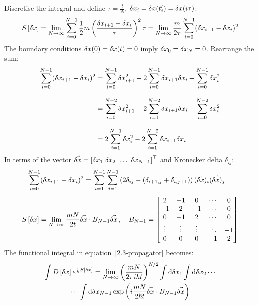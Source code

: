 Discretise the integral and define $\tau = \frac{t}{N}$,
$\delta{x}_i = \delta{x}(t^\prime_i) = \delta{x}(i\tau)$:
\begin{equation*}
  S\left[{\delta{x}}\right]
  =
  \lim_{N \to \infty} \sum_{i=0}^{N-1} \frac{1}{2} m \left(\frac{\delta{x}_{i+1} - \delta{x}_i}{\tau}\right)^2 \tau
  =
  \lim_{N \to \infty} \frac{m}{2\tau} \sum_{i=0}^{N-1} (\delta{x}_{i+1}-\delta{x}_i)^2
\end{equation*}
The boundary conditions $\delta{x}(0) = \delta{x}(t) = 0$ imply $\delta{x}_0 = \delta{x}_N = 0$.
Rearrange the sum:
\begin{align*}
  \sum_{i=0}^{N-1} (\delta{x}_{i+1}-\delta{x}_i)^2
   & =
  \sum_{i=0}^{N-1} \delta{x}_{i+1}^2 -
  2\sum_{i=0}^{N-1} \delta{x}_{i+1}\delta{x}_i +
  \sum_{i=0}^{N-1} \delta{x}_{i}^2
  \\[2ex]
   & =
  \sum_{i=0}^{N-2} \delta{x}_{i+1}^2 -
  2\sum_{i=1}^{N-2} \delta{x}_{i+1}\delta{x}_i +
  \sum_{i=0}^{N-2} \delta{x}_{i}^2
  \\[2ex]
   & =
  2\sum_{i=1}^{N-1} \delta{x}_{i}^2 -
  2\sum_{i=1}^{N-2} \delta{x}_{i+1}\delta{x}_i
\end{align*}
In terms of the vector
$\vec{\xd} = \left[\xd_1\ \xd_2\ \dots\ \xd_{N-1}\right]^\top$
and Kronecker delta $\delta_{ij}$:
\begin{align*}
  \sum_{i=0}^{N-1} (\delta{x}_{i+1}-\delta{x}_i)^2
   & =
  \sum_{i=1}^{N-1} \sum_{j=1}^{N-1}
  \left(2\delta_{ij} - (\delta_{i+1,j}+\delta_{i,j+1})\right)
  (\vec{\delta{x}})_{i}(\vec{\delta{x}})_{j}
\end{align*}
\begin{equation*}
  S\left[{\delta{x}}\right]
  =
  \lim_{N\to\infty}\frac{mN}{2t}\vec{\delta{x}}\cdot{B}_{N-1}\vec{\delta{x}}
  \,,\quad
  {B}_{N-1} =
  \begin{bmatrix}
    2      & - 1    & 0      & \cdots & 0
    \\
    -1     & 2      & -1     & \cdots & 0
    \\
    0      & -1     & 2      & \cdots & 0
    \\
    \vdots & \vdots & \vdots & \ddots & -1
    \\
    0      & 0      & 0      & -1     & 2
  \end{bmatrix}
\end{equation*}
The functional integral in equation~\ref{2.3-propagator} becomes:
\begin{multline}
  \label{2.3-deviation-action}
  \int D\left[{\delta{x}}\right] e^{\frac{i}{\hbar} S\left[{\delta{x}}\right]}
  =
  \lim_{N \to \infty}
  \left(\frac{mN}{2\pi i\hbar t}\right)^{N/2}
  \int\text{d}\delta{x}_{1}\int\text{d}\delta{x}_{2}\cdots
  \\
  \cdots\int\text{d}\delta{x}_{N-1}
  \exp\left(i \frac{mN}{2\hbar t} \vec{\delta{x}}\cdot{B}_{N-1}\vec{\delta{x}}\right)
\end{multline}
